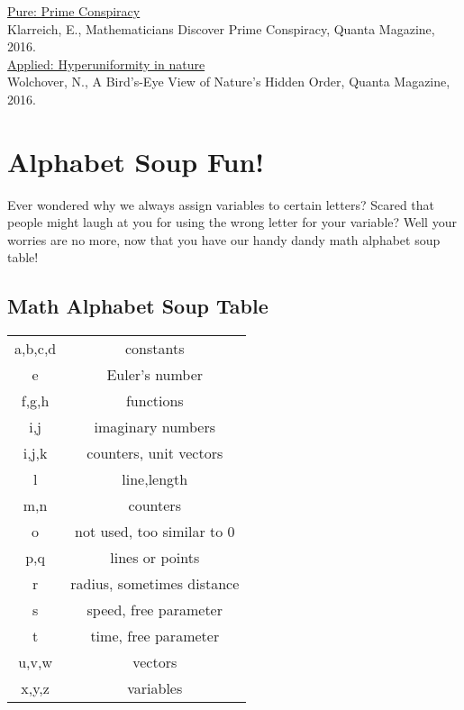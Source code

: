 \documentclass{article}
\begin{document}
\href{https://www.quantamagazine.org/mathematicians-discover-prime-conspiracy-20160313/}{Pure: Prime Conspiracy}\\
Klarreich, E., Mathematicians Discover Prime Conspiracy, Quanta Magazine, 2016.\\

\href{https://www.quantamagazine.org/hyperuniformity-found-in-birds-math-and-physics-20160712/}{Applied: Hyperuniformity in nature}\\
Wolchover, N., A Bird’s-Eye View of Nature’s Hidden Order, Quanta Magazine, 2016.\\


\section{Alphabet Soup Fun!}
\label{sec:Alphabet}
Ever wondered why we always assign variables to certain letters?
Scared that people might laugh at you for using the wrong letter for your variable?
Well your worries are no more, now that you have our handy dandy math alphabet soup table!\\

\begin{center}
    \section*{Math Alphabet Soup Table}
    \begin{center}
    \begin{tabular}{ c c}
    a,b,c,d & constants\\
    e & Euler's number\\
    f,g,h & functions\\
    i,j & imaginary numbers\\
    i,j,k & counters, unit vectors\\
    l & line,length\\
    m,n & counters\\
    o & not used, too similar to 0\\
    p,q & lines or points\\
    r & radius, sometimes distance\\
    s & speed, free parameter\\
    t & time, free parameter \\
    u,v,w & vectors\\
    x,y,z & variables\\
    \end{tabular}
    \end{center}
    
\end{center}
\end{document}
